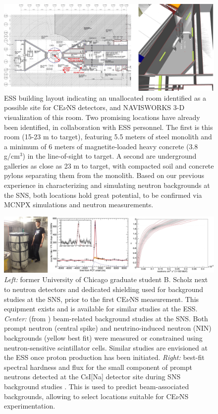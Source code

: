\documentclass[12pt]{article}
\begin{document}
\begin{figure}[H]
\begin{center}
\includegraphics[width=5.7in]{fig4.eps}
\caption{\label{fig:fig4} \scriptsize ESS building layout indicating an unallocated room  identified as a possible site for CE$\nu$NS detectors, and NAVISWORKS 3-D visualization of this room. Two promising locations have already been identified, in collaboration with ESS personnel. The first is this room (15-23 m to target), featuring 5.5 meters of steel monolith and a minimum of 6 meters of magnetite-loaded  heavy  concrete  (3.8 g/cm$^{3}$) in  the  line-of-sight to target.  A second are underground galleries as close as 23 m to target, with compacted soil and concrete pylons separating them from the  monolith. Based on our previous experience in characterizing and simulating neutron backgrounds at the SNS, both locations hold great potential, to be confirmed via MCNPX simulations and neutron measurements. }
\end{center}
\end{figure}

\begin{figure}[H]
\begin{center}
\includegraphics[width=6.2in]{fig5.eps}
\caption{\label{fig:fig5} \scriptsize {\it Left: }  former University of Chicago graduate student B. Scholz next to neutron detectors and dedicated shielding used for background studies at the SNS, prior to the first CE$\nu$NS measurement. This equipment exists and is available for similar studies at the ESS.  {\it Center:} (from \cite{science,bjorn}) beam-related background studies at the SNS. Both prompt neutron (central spike) and neutrino-induced neutron (NIN) backgrounds (yellow best fit) were measured or constrained using neutron-sensitive  scintillator cells. Similar studies are envisioned at the ESS once proton production has been initiated. {\it Right:} best-fit spectral hardness and flux for the small component of prompt neutrons detected at the CsI[Na] detector site during SNS background studies \cite{science,bjorn}. This is used to predict beam-associated backgrounds, allowing to select locations suitable for CE$\nu$NS experimentation. }
\end{center}
\end{figure}
\end{document}
